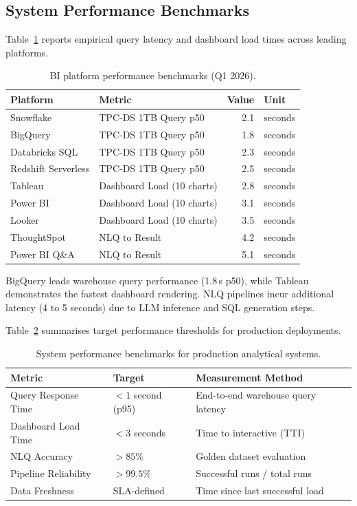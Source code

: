 \documentclass[12pt, a4paper]{article}
\begin{document}
\subsection{System Performance Benchmarks}

Table~\ref{tab:bi-perf} reports empirical query latency and dashboard load times across leading platforms.

\begin{table}[ht]
\centering
\caption{BI platform performance benchmarks (Q1 2026).}
\label{tab:bi-perf}
\begin{tabular}{llrl}
\toprule
\textbf{Platform} & \textbf{Metric} & \textbf{Value} & \textbf{Unit} \\
\midrule
Snowflake          & TPC-DS 1TB Query p50    & 2.1 & seconds \\
BigQuery           & TPC-DS 1TB Query p50    & 1.8 & seconds \\
Databricks SQL     & TPC-DS 1TB Query p50    & 2.3 & seconds \\
Redshift Serverless & TPC-DS 1TB Query p50   & 2.5 & seconds \\
\midrule
Tableau            & Dashboard Load (10 charts) & 2.8 & seconds \\
Power BI           & Dashboard Load (10 charts) & 3.1 & seconds \\
Looker             & Dashboard Load (10 charts) & 3.5 & seconds \\
\midrule
ThoughtSpot        & NLQ to Result           & 4.2 & seconds \\
Power BI Q\&A      & NLQ to Result           & 5.1 & seconds \\
\bottomrule
\end{tabular}
\end{table}

BigQuery leads warehouse query performance (1.8\,s p50), while Tableau demonstrates the fastest dashboard rendering. NLQ pipelines incur additional latency (4 to 5 seconds) due to LLM inference and SQL generation steps.

Table~\ref{tab:performance} summarises target performance thresholds for production deployments.

\begin{table}[ht]
\centering
\caption{System performance benchmarks for production analytical systems.}
\label{tab:performance}
\begin{tabular}{lll}
\toprule
\textbf{Metric} & \textbf{Target} & \textbf{Measurement Method} \\
\midrule
Query Response Time     & $<1$ second (p95) & End-to-end warehouse query latency \\
Dashboard Load Time     & $<3$ seconds      & Time to interactive (TTI) \\
NLQ Accuracy            & $>85\%$           & Golden dataset evaluation \\
Pipeline Reliability    & $>99.5\%$         & Successful runs / total runs \\
Data Freshness          & SLA-defined       & Time since last successful load \\
\bottomrule
\end{tabular}
\end{table}
\end{document}
